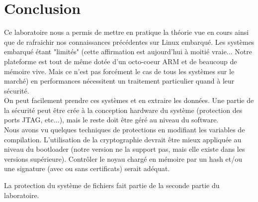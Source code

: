 
\chapter{Conclusion} %

\label{Conclusion} %



Ce laboratoire nous a permis de mettre en pratique la théorie vue en cours ainsi que de rafraichir nos connaissances précédentes sur Linux embarqué. Les systèmes embarqué étant "limités" (cette affirmation est aujourd'hui à moitié vraie... Notre plateforme est tout de même dotée d'un octo-coeur ARM et de beaucoup de mémoire vive. Mais ce n'est pas forcément le cas de tous les systèmes sur le marché) en performances nécessitent un traitement particulier quand à leur sécurité.\\ 

On peut facilement prendre ces systèmes et en extraire les données. Une partie de la sécurité peut être crée à la conception hardware du système (protection des ports JTAG, etc...), mais le reste doit être géré au niveau du software. \\

Nous avons vu quelques techniques de protections en modifiant les variables de compilation. L'utilisation de la cryptographie devrait être mieux appliquée au niveau du bootloader (notre version ne la support pas, mais elle existe dans les versions supérieure). Contrôler le noyau chargé en mémoire par un hash et/ou une signature (avec ou sans certificats) serait adéquat.    

La protection du système de fichiers fait partie de la seconde partie du laboratoire.